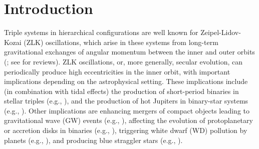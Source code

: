 \documentclass[twocolumn,appendixfloats,tighten]{aastex631}
\begin{document}
\section{Introduction}
\label{sect:intro}
Triple systems in hierarchical configurations are well known for Zeipel-Lidov-Kozai (ZLK) oscillations, which arise in these systems from long-term gravitational exchanges of angular momentum between the inner and outer orbits (\citealt{1910AN....183..345V,1962P&SS....9..719L,1962AJ.....67..591K}; see \citealt{2016ARA&A..54..441N,2017ASSL..441.....S,2019MEEP....7....1I} for reviews). ZLK oscillations, or, more generally, secular evolution, can periodically produce high eccentricities in the inner orbit, with important implications depending on the astrophysical setting. These implications include (in combination with tidal effects) the production of short-period binaries in stellar triples (e.g., \citealt{1979A&A....77..145M,1998MNRAS.300..292K,2001ApJ...562.1012E,2006Ap&SS.304...75E,2007ApJ...669.1298F,2014ApJ...793..137N}), and the production of hot Jupiters in binary-star systems (e.g., \citealt{2003ApJ...589..605W,2007ApJ...669.1298F,2012ApJ...754L..36N,2015ApJ...799...27P,2016MNRAS.456.3671A,2016ApJ...829..132P,2017ApJ...835L..24H}). Other implications are enhancing mergers of compact objects leading to gravitational wave (GW) events (e.g., \citealt{2002ApJ...578..775B,2011ApJ...741...82T,2013MNRAS.430.2262H,2014MNRAS.439.1079A,2017ApJ...841...77A,2017ApJ...836...39S,2017ApJ...846L..11L,2018ApJ...863...68L,2018ApJ...865....2H,2018ApJ...856..140H,2018ApJ...853...93R,2018ApJ...864..134R,2018A&A...610A..22T,2019MNRAS.486.4443F}), affecting the evolution of protoplanetary or accretion disks in binaries (e.g., \citealt{2014ApJ...792L..33M,2015ApJ...813..105F,2017MNRAS.467.1957Z,2017MNRAS.469.4292L,2018MNRAS.477.5207Z,2019MNRAS.485..315F,2019MNRAS.489.1797M}), triggering white dwarf (WD) pollution by planets (e.g., \citealt{2016MNRAS.462L..84H,2017ApJ...834..116P}), and producing blue straggler stars (e.g., \citealt{2009ApJ...697.1048P,2016ApJ...816...65A,2016MNRAS.460.3494S,2019MNRAS.488..728F}).
\end{document}
